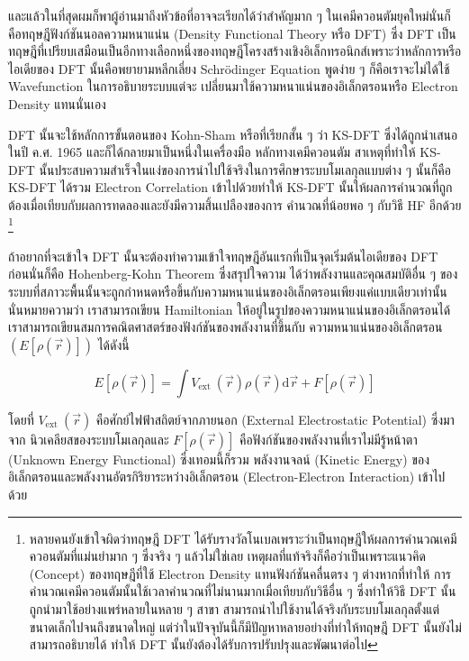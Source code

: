 และแล้วในที่สุดผมก็พาผู้อ่านมาถึงหัวข้อที่อาจจะเรียกได้ว่าสำคัญมาก ๆ ในเคมีควอนตัมยุคใหม่นั่นก็คือทฤษฎีฟังก์ชันนอลความหนาแน่น (Density
Functional Theory หรือ DFT) ซึ่ง DFT เป็นทฤษฎีที่เปรียบเสมือนเป็นอีกทางเลือกหนึ่งของทฤษฎีโครงสร้างเชิงอิเล็กทรอนิกส์เพราะว่าหลักการหรือ%
ไอเดียของ DFT นั้นคือพยายามหลีกเลี่ยง Schr\"{o}dinger Equation พูดง่าย ๆ ก็คือเราจะไม่ได้ใช้ Wavefunction ในการอธิบายระบบแต่จะ%
เปลี่ยนมาใช้ความหนาแน่นของอิเล็กตรอนหรือ Electron Density แทนนั่นเอง

DFT นั้นจะใช้หลักการขั้นตอนของ Kohn-Sham หรือที่เรียกสั้น ๆ ว่า KS-DFT ซึ่งได้ถูกนำเสนอในปี ค.ศ. 1965 และก็ได้กลายมาเป็นหนึ่งในเครื่องมือ%
หลักทางเคมีควอนตัม สาเหตุที่ทำให้ KS-DFT นั้นประสบความสำเร็จในแง่ของการนำไปใช้จริงในการศึกษาระบบโมเลกุลแบบต่าง ๆ นั้นก็คือ KS-DFT
ได้รวม Electron Correlation เข้าไปด้วยทำให้ KS-DFT นั้นให้ผลการคำนวณที่ถูกต้องเมื่อเทียบกับผลการทดลองและยังมีความสิ้นเปลืองของการ%
คำนวณที่น้อยพอ ๆ กับวิธี HF อีกด้วย%
\footnote{หลายคนยังเข้าใจผิดว่าทฤษฎี DFT ได้รับรางวัลโนเบลเพราะว่าเป็นทฤษฎีให้ผลการคำนวณเคมีควอนตัมที่แม่นยำมาก ๆ ซึ่งจริง ๆ
    แล้วไม่ใช่เลย เหตุผลที่แท้จริงก็คือว่าเป็นเพราะแนวคิด (Concept) ของทฤษฎีที่ใช้ Electron Density แทนฟังก์ชันคลื่นตรง ๆ ต่างหากที่ทำให้%
    การคำนวณเคมีควอนตัมนั้นใช้เวลาคำนวณที่ไม่นานมากเมื่อเทียบกับวิธีอื่น ๆ ซึ่งทำให้วิธี DFT นั้นถูกนำมาใช้อย่างแพร่หลายในหลาย ๆ สาขา
    สามารถนำไปใช้งานได้จริงกับระบบโมเลกุลตั้งแต่ขนาดเล็กไปจนถึงขนาดใหญ่ แต่ว่าในปัจจุบันนี้ก็มีปัญหาหลายอย่างที่ทำให้ทฤษฎี DFT
    นั้นยังไม่สามารถอธิบายได้ ทำให้ DFT นั้นยังต้องได้รับการปรับปรุงและพัฒนาต่อไป}

ถ้าอยากที่จะเข้าใจ DFT นั้นจะต้องทำความเข้าใจทฤษฎีอันแรกที่เป็นจุดเริ่มต้นไอเดียของ DFT ก่อนนั่นก็คือ Hohenberg-Kohn Theorem ซึ่งสรุปใจความ%
ได้ว่าพลังงานและคุณสมบัติอื่น ๆ ของระบบที่สภาวะพื้นนั้นจะถูกกำหนดหรือขึ้นกับความหนาแน่นของอิเล็กตรอนเพียงแค่แบบเดียวเท่านั้น นั่นหมายความว่า%
เราสามารถเขียน Hamiltonian ให้อยู่ในรูปของความหนาแน่นของอิเล็กตรอนได้ เราสามารถเขียนสมการคณิตศาสตร์ของฟังก์ชันของพลังงานที่ขึ้นกับ%
ความหนาแน่นของอิเล็กตรอน $(E[\rho(\vec{r})])$ ได้ดังนี้

\begin{equation}
    \label{eq:Energy_Functional_DFT}
    E[\rho(\vec{r})]
    =
    \int V_{\text{ext }}(\vec{r}) \rho(\vec{r}) \mathrm{d} \vec{r}
    + F[\rho(\vec{r})]
\end{equation}

\noindent โดยที่ $V_{\text{ext }}(\vec{r})$ คือศักย์ไฟฟ้าสถิตย์จากภายนอก (External Electrostatic Potential) ซึ่งมาจาก%
นิวเคลียสของระบบโมเลกุลและ $F[\rho(\vec{r})]$ คือฟังก์ชันของพลังงานที่เราไม่มีรู้หน้าตา (Unknown Energy Functional) ซึ่งเทอมนี้ก็รวม%
พลังงานจลน์ (Kinetic Energy) ของอิเล็กตรอนและพลังงานอัตรกิริยาระหว่างอิเล็กตรอน (Electron-Electron Interaction) เข้าไปด้วย

